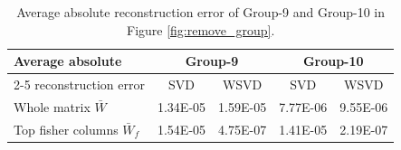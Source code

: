 \documentclass{article} %
\newcommand{\ting}[1]{}
\newcommand{\ting}[1]{{\color{orange}{(ting: #1)}}}
\begin{document}

% 
\begin{table}
\centering
\caption{Average absolute reconstruction error of Group-9 and Group-10 in Figure \ref{fig:remove_group}.}
\begin{tabular}{l|cc|cc}
\toprule
{Average absolute }& \multicolumn{2}{c|}{Group-9} & \multicolumn{2}{c}{Group-10} \\ \cline{2-5}
 reconstruction error & SVD & WSVD & SVD & WSVD \\ \midrule
Whole matrix $\bar W$ & 1.34E-05 & 1.59E-05 & 7.77E-06 & 9.55E-06 \\
Top fisher columns $\bar W_f$ & 1.54E-05 & 4.75E-07 & 1.41E-05 & 2.19E-07 \\
\bottomrule
\end{tabular}
\end{table}


\end{document}
